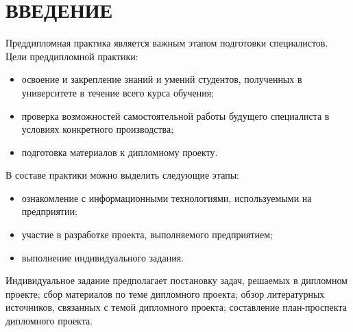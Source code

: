 \section*{ВВЕДЕНИЕ}

Преддипломная практика является важным этапом подготовки специалистов.
Цели преддипломной практики:
\begin{itemize}
  \item освоение и закрепление знаний и умений студентов,
    полученных в университете в течение всего курса обучения;
  \item проверка возможностей самостоятельной работы будущего специалиста
    в условиях конкретного производства;
  \item подготовка материалов к дипломному проекту.
\end{itemize}

В составе практики можно выделить следующие этапы:
\begin{itemize}
  \item ознакомление с информационными технологиями, используемыми на предприятии;
  \item участие в разработке проекта, выполняемого предприятием;
  \item выполнение индивидуального задания.
\end{itemize}

Индивидуальное задание предполагает
постановку задач, решаемых в дипломном проекте;
сбор материалов по теме дипломного проекта;
обзор литературных источников, связанных с темой дипломного проекта;
составление план-проспекта дипломного проекта.
